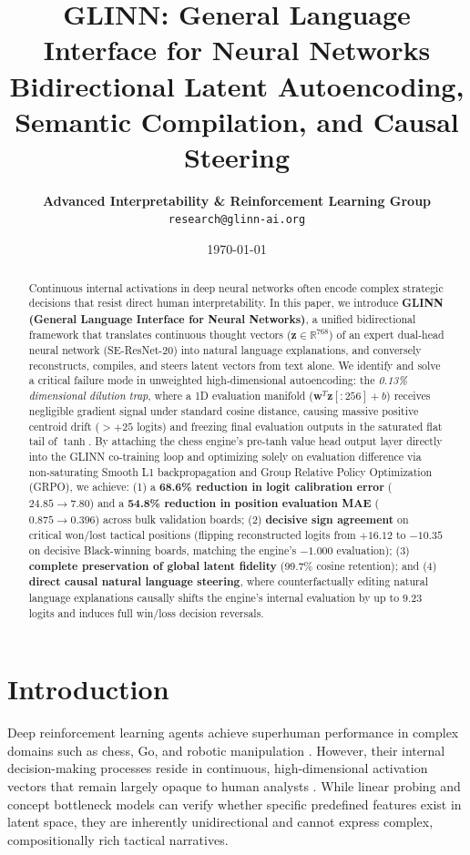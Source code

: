 \documentclass[10pt,twocolumn]{article}
\title{\textbf{GLINN: General Language Interface for Neural Networks \\ \Large Bidirectional Latent Autoencoding, Semantic Compilation, and Causal Steering}}
\author{
    \textbf{Advanced Interpretability \& Reinforcement Learning Group} \\
    \texttt{research@glinn-ai.org}
}
\date{\today}
\begin{document}
\maketitle

\begin{abstract}
Continuous internal activations in deep neural networks often encode complex strategic decisions that resist direct human interpretability. In this paper, we introduce \textbf{GLINN (General Language Interface for Neural Networks)}, a unified bidirectional framework that translates continuous thought vectors ($\mathbf{z} \in \mathbb{R}^{768}$) of an expert dual-head neural network (SE-ResNet-20) into natural language explanations, and conversely reconstructs, compiles, and steers latent vectors from text alone. We identify and solve a critical failure mode in unweighted high-dimensional autoencoding: the \textit{0.13\% dimensional dilution trap}, where a 1D evaluation manifold ($\mathbf{w}^T \mathbf{z}[:256] + b$) receives negligible gradient signal under standard cosine distance, causing massive positive centroid drift ($> +25$ logits) and freezing final evaluation outputs in the saturated flat tail of $\tanh$. By attaching the chess engine's pre-tanh value head output layer directly into the GLINN co-training loop and optimizing solely on evaluation difference via non-saturating Smooth L1 backpropagation and Group Relative Policy Optimization (GRPO), we achieve: (1) a \textbf{68.6\% reduction in logit calibration error} ($24.85 \to 7.80$) and a \textbf{54.8\% reduction in position evaluation MAE} ($0.875 \to 0.396$) across bulk validation boards; (2) \textbf{decisive sign agreement} on critical won/lost tactical positions (flipping reconstructed logits from $+16.12$ to $-10.35$ on decisive Black-winning boards, matching the engine's $-1.000$ evaluation); (3) \textbf{complete preservation of global latent fidelity} (99.7\% cosine retention); and (4) \textbf{direct causal natural language steering}, where counterfactually editing natural language explanations causally shifts the engine's internal evaluation by up to $9.23$ logits and induces full win/loss decision reversals.
\end{abstract}

\section{Introduction}
Deep reinforcement learning agents achieve superhuman performance in complex domains such as chess, Go, and robotic manipulation \cite{silver2018general}. However, their internal decision-making processes reside in continuous, high-dimensional activation vectors that remain largely opaque to human analysts \cite{mcgrath2022acquisition}. While linear probing \cite{alain2016understanding} and concept bottleneck models \cite{koh2020concept} can verify whether specific predefined features exist in latent space, they are inherently unidirectional and cannot express complex, compositionally rich tactical narratives.
\end{document}
